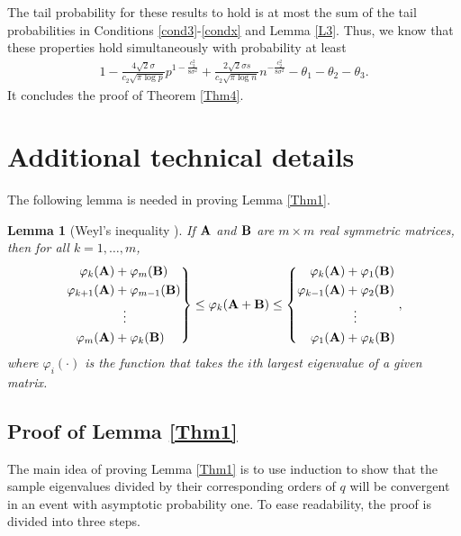 \documentclass{statsoc}
\newtheorem{lemma}{Lemma}
\newcommand{\bA}{\mbox{\bf A}}
\newcommand{\bB}{\mbox{\bf B}}
\begin{document}
The tail probability for these results to hold is at most the sum of the tail probabilities in Conditions \ref{cond3}-\ref{condx} and Lemma \ref{L3}. Thus, we know that these properties hold  simultaneously with probability at least
\begin{align*}
1 - \frac{4\sqrt{2}\sigma}{c_2 \sqrt{\pi \log p}} p^{1 - \frac{c_2^2}{8 \sigma^2}} + \frac{2\sqrt{2}\sigma s}{c_2 \sqrt{\pi \log n}} n^{-\frac{c_2^2}{8 \sigma^2}} - \theta_1 - \theta_2 - \theta_3.
\end{align*}
It concludes the proof of Theorem \ref{Thm4}.


\section{Additional technical details} \label{SecL}

The following lemma is needed in proving Lemma \ref{Thm1}.
\begin{lemma} [Weyl's inequality \citep{Horn1990}] \label{lem1}
If $\bA$ and $\bB$ are $m \times m$ real symmetric matrices, then for all $k = 1, \dots, m$,
\begin{equation*}
\left.\begin{aligned}
\varphi_k(\bA) &+ \varphi_m(\bB)\\
\varphi_{k + 1}(\bA) &+ \varphi_{m - 1}(\bB)\\
&\ \ \vdots\\
\varphi_m(\bA) &+ \varphi_k(\bB)
\end{aligned} \right\} \leq \varphi_k(\bA + \bB) \leq
\left\{\begin{aligned}
\varphi_k(\bA) &+ \varphi_1(\bB)\\
\varphi_{k - 1}(\bA) &+ \varphi_2(\bB)\\
&\ \ \vdots\\
\varphi_1(\bA) &+ \varphi_k(\bB)
\end{aligned} \right.,
\end{equation*}
where $\varphi_i(\cdot)$ is the function that takes the $i$th largest eigenvalue of a given matrix.
\end{lemma}

\subsection{Proof of Lemma \ref{Thm1}} \label{A.1}

\smallskip

The main idea of proving Lemma \ref{Thm1} is to use induction to show that the sample eigenvalues divided by their corresponding orders of $q$ will be convergent in an event with asymptotic probability one. To ease readability, the proof is divided into three steps.
\end{document}
